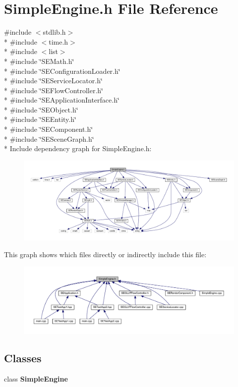 \section{Simple\+Engine.\+h File Reference}
\label{_simple_engine_8h}
{\ttfamily \#include $<$stdlib.\+h$>$}\\*
{\ttfamily \#include $<$time.\+h$>$}\\*
{\ttfamily \#include $<$list$>$}\\*
{\ttfamily \#include \char`\"{}S\+E\+Math.\+h\char`\"{}}\\*
{\ttfamily \#include \char`\"{}S\+E\+Configuration\+Loader.\+h\char`\"{}}\\*
{\ttfamily \#include \char`\"{}S\+E\+Service\+Locator.\+h\char`\"{}}\\*
{\ttfamily \#include \char`\"{}S\+E\+Flow\+Controller.\+h\char`\"{}}\\*
{\ttfamily \#include \char`\"{}S\+E\+Application\+Interface.\+h\char`\"{}}\\*
{\ttfamily \#include \char`\"{}S\+E\+Object.\+h\char`\"{}}\\*
{\ttfamily \#include \char`\"{}S\+E\+Entity.\+h\char`\"{}}\\*
{\ttfamily \#include \char`\"{}S\+E\+Component.\+h\char`\"{}}\\*
{\ttfamily \#include \char`\"{}S\+E\+Scene\+Graph.\+h\char`\"{}}\\*
Include dependency graph for Simple\+Engine.\+h\+:
\nopagebreak
\begin{figure}[H]
\begin{center}
\leavevmode
\includegraphics[width=350pt]{_simple_engine_8h__incl}
\end{center}
\end{figure}
This graph shows which files directly or indirectly include this file\+:
\nopagebreak
\begin{figure}[H]
\begin{center}
\leavevmode
\includegraphics[width=350pt]{_simple_engine_8h__dep__incl}
\end{center}
\end{figure}
\subsection*{Classes}
\begin{DoxyCompactItemize}
\item 
class {\bf Simple\+Engine}
\end{DoxyCompactItemize}
